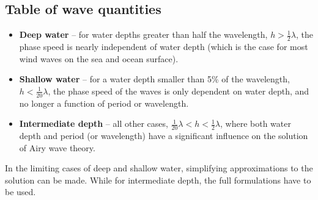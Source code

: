 \documentclass[a4paper,12pt]{report}
\begin{document}
\subsection{Table of wave quantities}
\begin{itemize}
\item \textbf{Deep water} – for water depths greater than half the wavelength, \( h > \frac{1}{2} \lambda \), the phase speed is nearly independent of water depth (which is the case for most wind waves on the sea and ocean surface).
\item \textbf{Shallow water} – for a water depth smaller than 5\% of the wavelength, \( h < \frac{1}{20} \lambda \), the phase speed of the waves is only dependent on water depth, and no longer a function of period or wavelength.
\item \textbf{Intermediate depth} – all other cases, \( \frac{1}{20} \lambda < h < \frac{1}{2} \lambda \), where both water depth and period (or wavelength) have a significant influence on the solution of Airy wave theory.
\end{itemize}
In the limiting cases of deep and shallow water, simplifying approximations to the solution can be made. While for intermediate depth, the full formulations have to be used.
\end{document}
